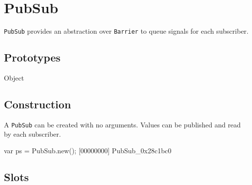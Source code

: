 
\section{PubSub}

\lstinline|PubSub| provides an abstraction over \lstinline|Barrier|
 to queue signals for each subscriber.

\subsection{Prototypes}

\begin{refObjects}
\item[Object]
\end{refObjects}

\subsection{Construction}

A \lstinline|PubSub| can be created with no arguments.  Values can be
published and read by each subscriber.

\begin{urbiscript}[firstnumber=1]
var ps = PubSub.new();
[00000000] PubSub_0x28c1bc0
\end{urbiscript}

\subsection{Slots}

